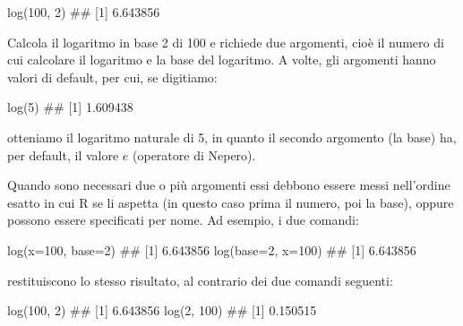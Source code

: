 \documentclass[a4paper,12pt,oneside]{book}
\newenvironment{Shaded}{\begin{snugshade}}{\end{snugshade}}
\newcommand{\DecValTok}[1]{#1}
\newcommand{\DocumentationTok}[1]{#1}
\newcommand{\FunctionTok}[1]{#1}
\newcommand{\AttributeTok}[1]{#1}
\newcommand{\NormalTok}[1]{#1}
\begin{document}
\begin{Shaded}
\begin{Highlighting}[]
\FunctionTok{log}\NormalTok{(}\DecValTok{100}\NormalTok{, }\DecValTok{2}\NormalTok{)}
\DocumentationTok{\#\# [1] 6.643856}
\end{Highlighting}
\end{Shaded}

Calcola il logaritmo in base 2 di 100 e richiede due argomenti, cioè il numero di cui calcolare il logaritmo e la base del logaritmo. A volte, gli argomenti hanno valori di default, per cui, se digitiamo:

\begin{Shaded}
\begin{Highlighting}[]
\FunctionTok{log}\NormalTok{(}\DecValTok{5}\NormalTok{)}
\DocumentationTok{\#\# [1] 1.609438}
\end{Highlighting}
\end{Shaded}

otteniamo il logaritmo naturale di 5, in quanto il secondo argomento (la base) ha, per default, il valore \(e\) (operatore di Nepero).

Quando sono necessari due o più argomenti essi debbono essere messi nell'ordine esatto in cui R se li aspetta (in questo caso prima il numero, poi la base), oppure possono essere specificati per nome. Ad esempio, i due comandi:

\begin{Shaded}
\begin{Highlighting}[]
\FunctionTok{log}\NormalTok{(}\AttributeTok{x=}\DecValTok{100}\NormalTok{, }\AttributeTok{base=}\DecValTok{2}\NormalTok{)}
\DocumentationTok{\#\# [1] 6.643856}
\FunctionTok{log}\NormalTok{(}\AttributeTok{base=}\DecValTok{2}\NormalTok{, }\AttributeTok{x=}\DecValTok{100}\NormalTok{)}
\DocumentationTok{\#\# [1] 6.643856}
\end{Highlighting}
\end{Shaded}

restituiscono lo stesso risultato, al contrario dei due comandi seguenti:

\begin{Shaded}
\begin{Highlighting}[]
\FunctionTok{log}\NormalTok{(}\DecValTok{100}\NormalTok{, }\DecValTok{2}\NormalTok{)}
\DocumentationTok{\#\# [1] 6.643856}
\FunctionTok{log}\NormalTok{(}\DecValTok{2}\NormalTok{, }\DecValTok{100}\NormalTok{)}
\DocumentationTok{\#\# [1] 0.150515}
\end{Highlighting}
\end{Shaded}
\end{document}
